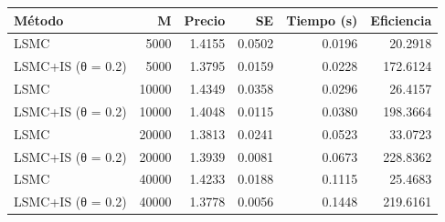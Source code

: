 \begin{tabular}{lrrrrr}
\toprule
Método & M & Precio & SE & Tiempo (s) & Eficiencia \\
\midrule
LSMC & 5000 & 1.4155 & 0.0502 & 0.0196 & 20.2918 \\
LSMC+IS (θ = 0.2) & 5000 & 1.3795 & 0.0159 & 0.0228 & 172.6124 \\
LSMC & 10000 & 1.4349 & 0.0358 & 0.0296 & 26.4157 \\
LSMC+IS (θ = 0.2) & 10000 & 1.4048 & 0.0115 & 0.0380 & 198.3664 \\
LSMC & 20000 & 1.3813 & 0.0241 & 0.0523 & 33.0723 \\
LSMC+IS (θ = 0.2) & 20000 & 1.3939 & 0.0081 & 0.0673 & 228.8362 \\
LSMC & 40000 & 1.4233 & 0.0188 & 0.1115 & 25.4683 \\
LSMC+IS (θ = 0.2) & 40000 & 1.3778 & 0.0056 & 0.1448 & 219.6161 \\
\bottomrule
\end{tabular}
